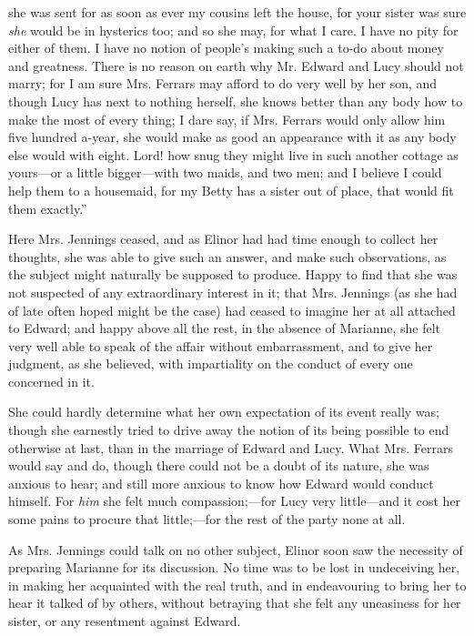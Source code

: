 she was sent for as soon as ever my cousins left the house, for your sister was sure {\em she} would be in hysterics too; and so she may, for what I care. I have no pity for either of them. I have no notion of people's making such a to-do about money and greatness. There is no reason on earth why Mr. Edward and Lucy should not marry; for I am sure Mrs. Ferrars may afford to do very well by her son, and though Lucy has next to nothing herself, she knows better than any body how to make the most of every thing; I dare say, if Mrs. Ferrars would only allow him five hundred a-year, she would make as good an appearance with it as any body else would with eight. Lord! how snug they might live in such another cottage as yours---or a little bigger---with two maids, and two men; and I believe I could help them to a housemaid, for my Betty has a sister out of place, that would fit them exactly.”

Here Mrs. Jennings ceased, and as Elinor had had time enough to collect her thoughts, she was able to give such an answer, and make such observations, as the subject might naturally be supposed to produce. Happy to find that she was not suspected of any extraordinary interest in it; that Mrs. Jennings (as she had of late often hoped might be the case) had ceased to imagine her at all attached to Edward; and happy above all the rest, in the absence of Marianne, she felt very well able to speak of the affair without embarrassment, and to give her judgment, as she believed, with impartiality on the conduct of every one concerned in it.

She could hardly determine what her own expectation of its event really was; though she earnestly tried to drive away the notion of its being possible to end otherwise at last, than in the marriage of Edward and Lucy. What Mrs. Ferrars would say and do, though there could not be a doubt of its nature, she was anxious to hear; and still more anxious to know how Edward would conduct himself. For {\em him} she felt much compassion;---for Lucy very little---and it cost her some pains to procure that little;---for the rest of the party none at all.

As Mrs. Jennings could talk on no other subject, Elinor soon saw the necessity of preparing Marianne for its discussion. No time was to be lost in undeceiving her, in making her acquainted with the real truth, and in endeavouring to bring her to hear it talked of by others, without betraying that she felt any uneasiness for her sister, or any resentment against Edward.

